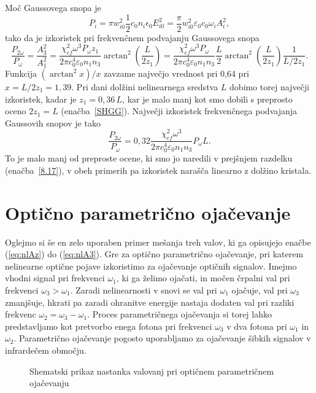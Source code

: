 Moč Gaussovega snopa je
\begin{equation}
P_{i}=\pi w_{i0}^{2} \frac{1}{2}c_0 n_i \epsilon_{0}E_{i0}^{2}=
\frac{\pi}{2}w_{i0}^{2}\varepsilon_0 c_0 \omega_{i} A_{i}^{2},
\label{8.26}
\end{equation}
tako da je izkoristek pri frekvenčnem podvajanju Gaussovega snopa 
\begin{equation}
\frac{P_{2\omega}}{P_{\omega}}=\frac{A_3^2}{A_1^2} = 
\frac{\chi_{ef}^2 \omega^3 P_\omega z_1}{2 \pi c_0^4 \varepsilon_0 n_1 n_3} 
\arctan^2 \left( \frac{L}{2z_1}\right)
= \frac{\chi_{ef}^2 \omega^3 P_\omega}{2 \pi c_0^4 \varepsilon_0 n_1 n_3} \frac{L}{2}
\arctan^2 \left( \frac{L}{2z_1}\right) \frac{1}{L/2z_1}.
\label{8.27}
\end{equation}
Funkcija $(\arctan^{2}x)/x$ zavzame največjo vrednost pri 0,64 pri $x =L/2z_1=1,39$.
Pri dani dolžini nelinearnega sredstva $L$ dobimo torej največji
izkoristek, kadar je $z_{1}=0,36\,L$, kar je malo manj kot smo dobili
s preprosto oceno $2z_{1}=L$ (enačba~\ref{SHGG}). Največji izkoristek
frekvenčnega podvajanja Gaussovih snopov je tako
\begin{equation}
\frac{P_{2\omega}}{P_{\omega}}
= 0,32 \frac{\chi_{ef}^2 \omega^3 }{2 \pi c_0^4 \varepsilon_0 n_1 n_3} P_\omega L.
\label{8.28}
\end{equation}
To je malo manj od preproste ocene, ki smo jo naredili v prejšnjem razdelku (enačba~\ref{8.17}),
v obeh primerih pa izkoristek narašča linearno z dolžino kristala.

\section{Optično parametrično ojačevanje}

Oglejmo si še en zelo uporaben primer mešanja treh valov, 
ki ga opisujejo enačbe (\ref{eq:nlAz}) do (\ref{eq:nlA3}). Gre za
optično parametrično ojačevanje, pri katerem nelinearne optične pojave
izkoristimo za ojačevanje optičnih signalov. Imejmo vhodni
signal pri frekvenci $\omega_{1}$, ki ga želimo ojačati, in močen črpalni val
pri frekvenci $\omega_{3}>\omega_{1}$. Zaradi nelinearnosti v snovi se 
val pri $\omega_{1}$ ojačuje, val pri $\omega_{3}$ zmanjšuje, hkrati pa zaradi
ohranitve energije nastaja dodaten val pri razliki frekvenc
$\omega_{2}=\omega_{3}-\omega_{1}$. Proces parametričnega ojačevanja 
si torej lahko predstavljamo kot pretvorbo enega fotona pri frekvenci 
$\omega_{3}$ v dva fotona pri $\omega_{1}$ in $\omega_{2}$.
Parametrično ojačevanje pogosto uporabljamo za ojačevanje šibkih signalov 
v infrardečem območju.
\begin{figure}[h]
\centering
\def\svgwidth{100truemm} 

\caption{Shematski prikaz nastanka valovanj pri optičnem parametričnem ojačevanju}
\label{fig:opa2}
\end{figure}

